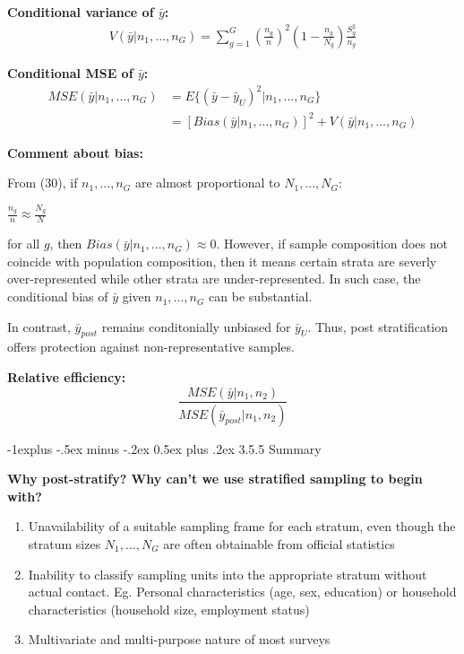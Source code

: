 \documentclass[10pt,landscape]{article}
\makeatletter
\renewcommand{\subsection}{\@startsection{subsection}{2}{0mm}%
                                {-1explus -.5ex minus -.2ex}%
                                {0.5ex plus .2ex}%
                                {\normalfont\normalsize\bfseries}}
\makeatother
\begin{document}
\begin{multicols}{3}
\textbf{Conditional variance of $\bar{y}$:}
\begin{equation}
  \begin{split}
    V(\bar{y} | n_{1},...,n_{G}) = \sum_{g=1}^{G}(\frac{n_{g}}{n})^{2}(1 - \frac{n_{g}}{N_{g}}) \frac{S^{2}_{g}}{n_{g}}
  \end{split}
\end{equation}

\textbf{Conditional MSE of $\bar{y}$:}
\begin{equation}
  \begin{split}
    MSE(\bar{y} | n_{1},...,n_{G}) &= E\{(\bar{y} - \bar{y}_{U})^{2} | n_{1},...,n_{G}\} \\
    &= [Bias(\bar{y} | n_{1},...,n_{G})]^{2} + V(\bar{y} | n_{1},...,n_{G})
  \end{split}
\end{equation}

\textbf{Comment about bias:}

From (30), if $n_{1},...,n_{G}$ are almost proportional to $N_{1},...,N_{G}$:
\begin{center}
  $\frac{n_{g}}{n} \approx \frac{N_{g}}{N}$
\end{center}
for all $g$, then $Bias(\bar{y} | n_{1},...,n_{G}) \approx 0$. However, if sample composition does not coincide with population composition, then it means certain strata are severly over-represented while other strata are under-represented. In such case, the conditional bias of $\bar{y}$ given $n_{1},...,n_{G}$ can be substantial.

\vspace{5}

In contrast, $\bar{y}_{post}$ remains conditonially unbiased for $\bar{y}_{U}$. Thus, post stratification offers protection against non-representative samples.

\vspace{5}

\textbf{Relative efficiency:}
\begin{equation}
  \frac{MSE(\bar{y}|n_{1}, n_{2})}{MSE(\bar{y}_{post}|n_{1}, n_{2})}
\end{equation}

\subsection{3.5.5 Summary}

\textbf{Why post-stratify? Why can't we use stratified sampling to begin with?}
\begin{enumerate}
  \item Unavailability of a suitable sampling frame for each stratum, even though the stratum sizes $N_{1},...,N_{G}$ are often obtainable from official statistics
  \item Inability to classify sampling units into the appropriate stratum without actual contact. Eg. Personal characteristics (age, sex, education) or household characteristics (household size, employment status)
  \item Multivariate and multi-purpose nature of most surveys
\end{enumerate}


\end{multicols}
\end{document}

